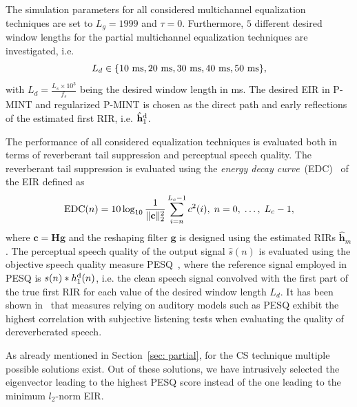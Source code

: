\documentclass[10pt]{IEEEtran}
\begin{document}
The simulation parameters for all considered multichannel equalization techniques are set to  $L_g = 1999$ and $\tau = 0$.
Furthermore, $5$ different desired window lengths for the partial multichannel equalization techniques are investigated, i.e.
\begin{equation}
L_d \in \{ 10~{\rm ms}, 20~{\rm ms}, 30~{\rm ms}, 40~{\rm ms}, 50~{\rm ms} \},
\end{equation}
with $L_d = \frac{L_s \times 10^3}{f_s}$ being the desired window length in ms.
The desired EIR in P-MINT and regularized P-MINT is chosen as the direct path and early reflections of the estimated first RIR, i.e. $\hat{\mathbf{h}}_1^{\rm d}$.

The performance of all considered equalization techniques is evaluated both in terms of reverberant tail suppression and perceptual speech quality.
The reverberant tail suppression is evaluated using the \emph{energy decay curve}~(EDC)~\cite{Naylor_Derev_book} of the EIR defined as
\begin{equation}
{\rm EDC}(n) = 10 \log_{10} \frac{1}{\|\mathbf{c}\|_2^2} \sum_{i = n}^{L_c-1} c^2(i), \; n =0, \; \ldots, \; L_c-1,
\end{equation}
where $\mathbf{c} = \mathbf{H}\mathbf{g}$ and the reshaping filter $\mathbf{g}$ is designed using the estimated RIRs $\hat{\mathbf{h}}_m$.
The perceptual speech quality of the output signal $\hat{s}(n)$ is evaluated using the objective speech quality measure PESQ~\cite{PESQ}, where the reference signal employed in PESQ is $s(n) \ast h_1^{\rm d}(n)$, i.e. the clean speech signal convolved with the first part of the true first RIR for each value of the desired window length $L_d$.
It has been shown in~\cite{Goetze_AES_2010} that measures relying on auditory models such as PESQ exhibit the highest correlation with subjective listening tests when evaluating the quality of dereverberated speech.

As already mentioned in Section~\ref{sec: partial}, for the CS technique multiple possible solutions exist.
Out of these solutions, we have intrusively selected the eigenvector leading to the highest PESQ score instead of the one leading to the minimum $l_2$-norm EIR.
\end{document}

